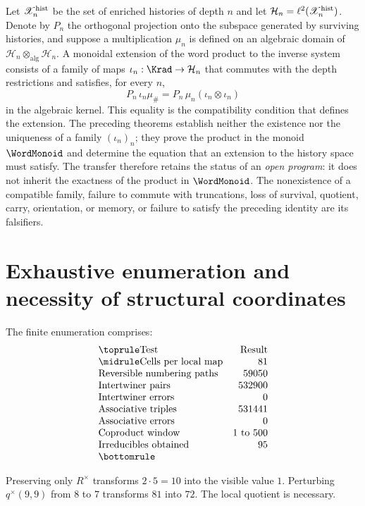 Let \(\mathscr X_n^{\rm hist}\) be the set of enriched histories of
depth \(n\) and let
\(\mathcal H_n=\ell^2(\mathscr X_n^{\rm hist})\). Denote by \(P_n\) the
orthogonal projection onto the subspace generated by surviving
histories, and suppose a multiplication \(\mu_n\) is defined on an
algebraic domain of
\(\mathcal H_n\otimes_{\mathrm{alg}}\mathcal H_n\). A monoidal extension
of the word product to the inverse system consists of a family of
maps \(\iota_n:\Krad\to\mathcal H_n\) that commutes with the
depth restrictions and satisfies, for every \(n\),
\[
 P_n\,\iota_n\mu_\#
 =P_n\,\mu_n
 (\iota_n\otimes\iota_n)
\]
in the algebraic kernel. This equality is the compatibility condition that
defines the extension. The preceding theorems establish neither the existence nor
the uniqueness of a family \((\iota_n)_n\); they prove the product in the
monoid \(\WordMonoid\) and determine the equation that an extension to the history
space must satisfy. The transfer therefore retains the status of an
\emph{open program}: it does not inherit the exactness of the product in
\(\WordMonoid\). The nonexistence of a compatible family, failure to
commute with truncations, loss of survival, quotient,
carry, orientation, or memory, or failure to satisfy the preceding identity
are its falsifiers.
\fi

\section{Exhaustive enumeration and necessity of structural coordinates}

The finite enumeration comprises:
\[
\begin{array}{@{}lr@{}}
\toprule
\text{Test}&\text{Result}\\\midrule
\text{Cells per local map}&81\\
\text{Reversible numbering paths}&59050\\
\text{Intertwiner pairs}&532900\\
\text{Intertwiner errors}&0\\
\text{Associative triples}&531441\\
\text{Associative errors}&0\\
\text{Coproduct window}&1\text{ to }500\\
\text{Irreducibles obtained}&95\\
\bottomrule
\end{array}
\]

\begin{definition}
Preserving only $R^\times$ transforms $2\cdot5=10$ into the visible value $1$.
Perturbing $q^\times(9,9)$ from $8$ to $7$ transforms $81$ into $72$. The local
quotient is necessary.
\end{definition}

